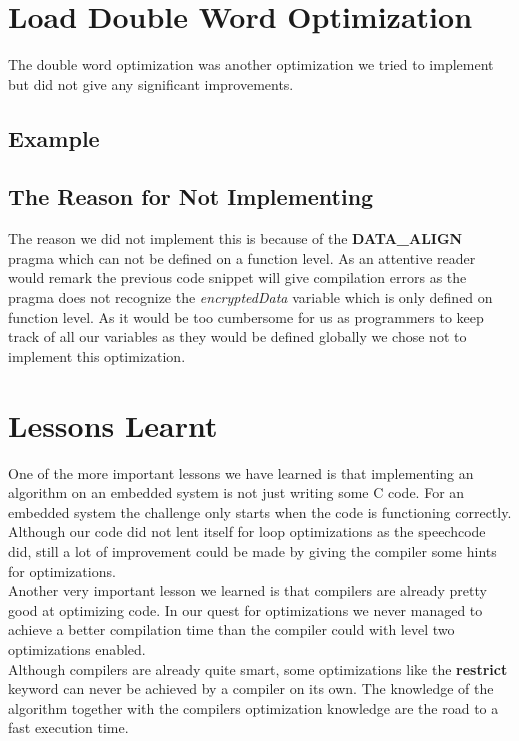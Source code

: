 \documentclass[a4paper]{article}
\begin{document}
\section{Load Double Word Optimization}
The double word optimization was another optimization we tried to implement but did not give any significant improvements.

\subsection{Example}


\subsection{The Reason for Not Implementing}
The reason we did not implement this is because of the \textbf{DATA\_ALIGN} pragma which can not be defined on a function level. As an attentive reader would remark the previous code snippet will give compilation errors as the pragma does not recognize the \textit{encryptedData} variable which is only defined on function level. As it would be too cumbersome for us as programmers to keep track of all our variables as they would be defined globally we chose not to implement this optimization.

\section{Lessons Learnt}
One of the more important lessons we have learned is that implementing an algorithm on an embedded system is not just writing some C code. For an embedded system the challenge only starts when the code is functioning correctly. Although our code did not lent itself for loop optimizations as the speechcode did, still a lot of improvement could be made by giving the compiler some hints for optimizations.\\

Another very important lesson we learned is that compilers are already pretty good at optimizing code. In our quest for optimizations we never managed to achieve a better compilation time than the compiler could with level two optimizations enabled. \\

Although compilers are already quite smart, some optimizations like the \textbf{restrict} keyword can never be achieved by a compiler on its own. The knowledge of the algorithm together with the compilers optimization knowledge are the road to a fast execution time.\\
\end{document}

